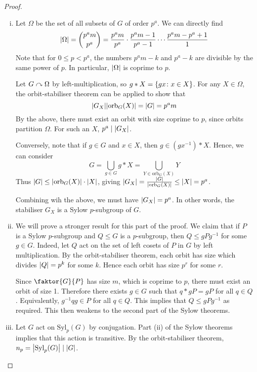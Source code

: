 \begin{proof}
	\begin{enumerate}[(i)]
		\item Let \( \Omega \) be the set of all subsets of \( G \) of order \( p^a \).
			We can directly find
			\[ \abs{\Omega} = \binom{p^a m}{p^a} = \frac{p^a m}{p^a} \cdot \frac{p^a m - 1}{p^a - 1} \cdots \frac{p^a m - p^a + 1}{1} \]
			Note that for \( 0 \leq p < p^a \), the numbers \( p^a m - k \) and \( p^a - k \) are divisible by the same power of \( p \).
			In particular, \( \abs{\Omega} \) is coprime to \( p \).

			Let \( G \curvearrowright \Omega \) by left-multiplication, so \( g \ast X = \qty{gx \colon x \in X} \).
			For any \( X \in \Omega \), the orbit-stabiliser theorem can be applied to show that
			\[ \abs{G_X} \abs{\mathrm{orb}_G(X)} = \abs{G} = p^a m \]
			By the above, there must exist an orbit with size coprime to \( p \), since orbits partition \( \Omega \).
			For such an \( X \), \( p^a \mid \abs{G_X} \).

			Conversely, note that if \( g \in G \) and \( x \in X \), then \( g \in (gx^{-1}) \ast X \).
			Hence, we can consider
			\[ G = \bigcup_{g \in G} g \ast X = \bigcup_{Y \in \mathrm{orb}_G(X)} Y \]
			Thus \( \abs{G} \leq \abs{\mathrm{orb}_G(X)} \cdot \abs{X} \), giving \( \abs{G_X} = \frac{\abs{G}}{\abs{\mathrm{orb}_G(X)}} \leq \abs{X} = p^a \).

			Combining wih the above, we must have \( \abs{G_X} = p^a \).
			In other words, the stabiliser \( G_X \) is a Sylow \( p \)-subgroup of \( G \).
		\item We will prove a stronger result for this part of the proof.
			We claim that if \( P \) is a Sylow \( p \)-subgroup and \( Q \leq G \) is a \( p \)-subgroup, then \( Q \leq g P g^{-1} \) for some \( g \in G \).
			Indeed, let \( Q \) act on the set of left cosets of \( P \) in \( G \) by left multiplication.
			By the orbit-stabiliser theorem, each orbit has size which divides \( \abs{Q} = p^k \) for some \( k \).
			Hence each orbit has size \( p^r \) for some \( r \).

			Since \( \faktor{G}{P} \) has size \( m \), which is coprime to \( p \), there must exist an orbit of size 1.
			Therefore there exists \( g \in G \) such that \( q \ast gP = gP \) for all \( q \in Q \).
			Equivalently, \( g^{-1} q g \in P \) for all \( q \in Q \).
			This implies that \( Q \leq gPg^{-1} \) as required.
			This then weakens to the second part of the Sylow theorems.
		\item Let \( G \) act on \( \mathrm{Syl}_p(G) \) by conjugation.
			Part (ii) of the Sylow theorems implies that this action is transitive.
			By the orbit-stabiliser theorem, \( n_p = \abs{\mathrm{Syl}_p(G)} \mid \abs{G} \).


\end{enumerate}
\end{proof}
